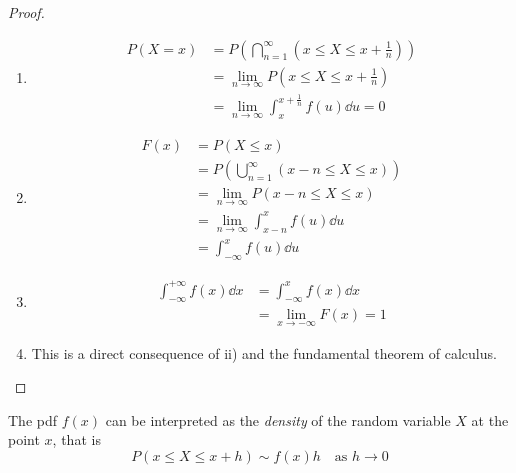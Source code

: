 \documentclass[14pt]{extarticle}
\begin{document}
\begin{proof}
    \skiplineafterproof
    \begin{enumerate}[label=\roman*)]
        \item
              \begin{align}
                  P(X = x) & = P(\bigcap_{n=1}^\infty (x \leq X \leq x + \frac{1}{n}))      \\
                           & = \lim_{n \to \infty} P(x \leq X \leq x + \frac{1}{n})         \\
                           & = \lim_{n \to \infty} \int_x^{x + \frac{1}{n}} f(u) \dd{u} = 0
              \end{align}

        \item
              \begin{align}
                  F(x) & = P(X \leq x)                                  \\
                       & = P (\bigcup_{n=1}^\infty (x-n \leq X \leq x)) \\
                       & = \lim_{n \to \infty} P(x-n \leq X \leq x)     \\
                       & = \lim_{n \to \infty} \int_{x-n}^x f(u) \dd{u} \\
                       & = \int_{-\infty}^x f(u) \dd{u}
              \end{align}

        \item
              \begin{align}
                  \int_{-\infty}^{+\infty} f(x) \dd{x} & = \int_{-\infty}^x f(x) \dd{x}  \\
                                                       & = \lim_{x \to -\infty} F(x) = 1
              \end{align}
        \item This is a direct consequence of ii) and the fundamental theorem of calculus.
    \end{enumerate}
\end{proof}

\begin{remark}
    The pdf $f(x)$ can be interpreted as the \emph{density} of the random variable $X$ at the point $x$, that is
    \begin{equation}
        P(x \leq X \leq x + h) \sim f(x) h \quad \text{as } h \to 0
    \end{equation}
\end{remark}
\end{document}
